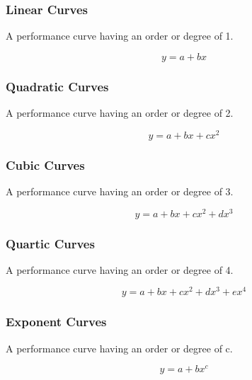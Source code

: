 \subsubsection{Linear Curves}\label{linear-curves}

A performance curve having an order or degree of 1.

\begin{equation}
y = a + bx
\end{equation}

\subsubsection{Quadratic Curves}\label{quadratic-curves}

A performance curve having an order or degree of 2.

\begin{equation}
y = a + bx + c{x^2}
\end{equation}

\subsubsection{Cubic Curves}\label{cubic-curves}

A performance curve having an order or degree of 3.

\begin{equation}
y = a + bx + c{x^2} + d{x^3}
\end{equation}

\subsubsection{Quartic Curves}\label{quartic-curves}

A performance curve having an order or degree of 4.

\begin{equation}
y = a + bx + c{x^2} + d{x^3} + e{x^4}
\end{equation}

\subsubsection{Exponent Curves}\label{exponent-curves}

A performance curve having an order or degree of c.

\begin{equation}
y = a + b{x^c}
\end{equation}

